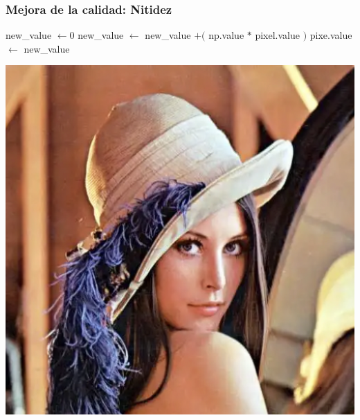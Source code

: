 \documentclass[
10pt, %
aspectratio=169, %
]{beamer}
\begin{document}
	\begin{frame}
		
		\frametitle{Mejora de la calidad: Nitidez}
		
		\begin{algorithmic}
					\State new\_value $\gets 0$ 
						\State new\_value $\gets$ new\_value $+($ np.value $*$ pixel.value $)$
					\EndFor
					pixe.value $\gets$ new\_value 
				\EndFor				
			\EndFunction
		\end{algorithmic}
		
		\centering
		\vspace{1\baselineskip}
		\includegraphics[scale=0.44]{lena.png} 

\end{frame}
\end{document}
